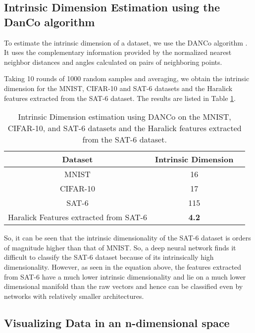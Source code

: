 \documentclass[11pt,a4paper]{article}
\begin{document}
\subsection{Intrinsic Dimension Estimation using the DanCo algorithm}
To estimate the intrinsic dimension of a dataset, we use the DANCo algorithm \cite{Ceruti20142569}. It uses the complementary information provided by the normalized nearest neighbor distances and angles calculated on pairs of neighboring points.

Taking 10 rounds of 1000 random samples and averaging, we obtain the intrinsic dimension for the MNIST, CIFAR-10 and SAT-6 datasets and the Haralick features extracted from the SAT-6 dataset. The results are listed in Table \ref{table:Intrinsic_Dimension}.

\begin{table}[h]
\centering
\begin{tabular}{ | c | c | c | }
    \hline
 \textbf{Dataset}  & \textbf{Intrinsic Dimension} \\  \hline
 MNIST & 16  \\  \hline
 CIFAR-10 & 17 \\ \hline
SAT-6 & 115 \\ \hline
Haralick Features extracted from SAT-6 & \textbf{4.2} \\ \hline
  \end{tabular}
  \caption{Intrinsic Dimension estimation using DANCo on the MNIST, CIFAR-10, and SAT-6 datasets and the Haralick features extracted from the SAT-6 dataset.}
  \label{table:Intrinsic_Dimension}
\end{table}

So, it can be seen that the intrinsic dimensionality of the SAT-6 dataset is orders of magnitude higher than that of MNIST. So, a deep neural network finds it difficult to classify the SAT-6 dataset because of its intrinsically high dimensionality. However, as seen in the equation above, the features extracted from SAT-6 have a much lower intrinsic dimensionality and lie on a much lower dimensional manifold than the raw vectors and hence can be classified even by networks with relatively smaller architectures.

\subsection{Visualizing Data in an n-dimensional space}
\end{document}
